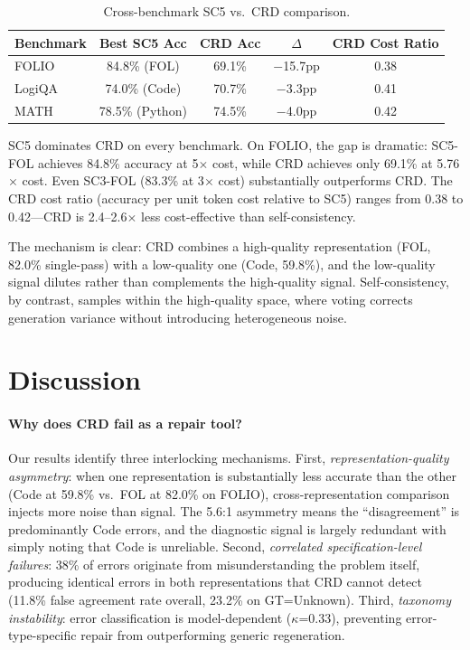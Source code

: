 \documentclass[11pt]{article}
\begin{document}
\begin{table}[t]
\centering
\caption{Cross-benchmark SC5 vs.\ CRD comparison.}
\label{tab:sc_cross}
\begin{tabular}{lcccc}
\toprule
Benchmark & Best SC5 Acc & CRD Acc & $\Delta$ & CRD Cost Ratio \\
\midrule
FOLIO  & 84.8\% (FOL) & 69.1\%  & $-$15.7pp & 0.38 \\
LogiQA & 74.0\% (Code) & 70.7\% & $-$3.3pp  & 0.41 \\
MATH   & 78.5\% (Python) & 74.5\% & $-$4.0pp & 0.42 \\
\bottomrule
\end{tabular}
\end{table}

SC5 dominates CRD on every benchmark. On FOLIO, the gap is dramatic: SC5-FOL achieves 84.8\% accuracy at 5$\times$ cost, while CRD achieves only 69.1\% at 5.76$\times$ cost. Even SC3-FOL (83.3\% at 3$\times$ cost) substantially outperforms CRD. The CRD cost ratio (accuracy per unit token cost relative to SC5) ranges from 0.38 to 0.42---CRD is 2.4--2.6$\times$ less cost-effective than self-consistency.

The mechanism is clear: CRD combines a high-quality representation (FOL, 82.0\% single-pass) with a low-quality one (Code, 59.8\%), and the low-quality signal dilutes rather than complements the high-quality signal. Self-consistency, by contrast, samples within the high-quality space, where voting corrects generation variance without introducing heterogeneous noise.

\section{Discussion}

\paragraph{Why does CRD fail as a repair tool?} Our results identify three interlocking mechanisms. First, \emph{representation-quality asymmetry}: when one representation is substantially less accurate than the other (Code at 59.8\% vs.\ FOL at 82.0\% on FOLIO), cross-representation comparison injects more noise than signal. The 5.6:1 asymmetry means the ``disagreement'' is predominantly Code errors, and the diagnostic signal is largely redundant with simply noting that Code is unreliable. Second, \emph{correlated specification-level failures}: 38\% of errors originate from misunderstanding the problem itself, producing identical errors in both representations that CRD cannot detect (11.8\% false agreement rate overall, 23.2\% on GT=Unknown). Third, \emph{taxonomy instability}: error classification is model-dependent ($\kappa$=0.33), preventing error-type-specific repair from outperforming generic regeneration.
\end{document}
